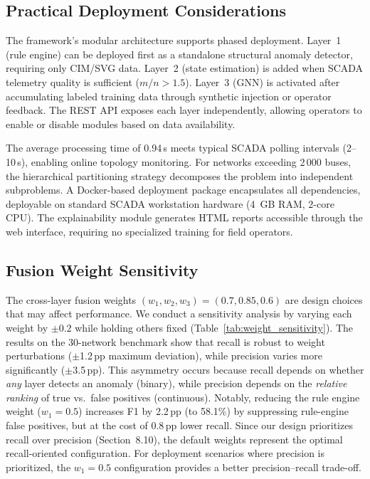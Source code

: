\documentclass[research]{fcs}
\begin{document}
\subsection{Practical Deployment Considerations}

The framework's modular architecture supports phased deployment. Layer~1 (rule engine) can be deployed first as a standalone structural anomaly detector, requiring only CIM/SVG data. Layer~2 (state estimation) is added when SCADA telemetry quality is sufficient ($m/n > 1.5$). Layer~3 (GNN) is activated after accumulating labeled training data through synthetic injection or operator feedback. The REST API exposes each layer independently, allowing operators to enable or disable modules based on data availability.

The average processing time of 0.94\,s meets typical SCADA polling intervals (2--10\,s), enabling online topology monitoring. For networks exceeding 2\,000 buses, the hierarchical partitioning strategy decomposes the problem into independent subproblems. A Docker-based deployment package encapsulates all dependencies, deployable on standard SCADA workstation hardware (4~GB RAM, 2-core CPU). The explainability module generates HTML reports accessible through the web interface, requiring no specialized training for field operators.

\subsection{Fusion Weight Sensitivity}

The cross-layer fusion weights $(w_1, w_2, w_3) = (0.7, 0.85, 0.6)$ are design choices that may affect performance. We conduct a sensitivity analysis by varying each weight by $\pm 0.2$ while holding others fixed (Table~\ref{tab:weight_sensitivity}). The results on the 30-network benchmark show that recall is robust to weight perturbations ($\pm$1.2\,pp maximum deviation), while precision varies more significantly ($\pm$3.5\,pp). This asymmetry occurs because recall depends on whether \emph{any} layer detects an anomaly (binary), while precision depends on the \emph{relative ranking} of true vs.\ false positives (continuous). Notably, reducing the rule engine weight ($w_1 = 0.5$) increases F1 by 2.2\,pp (to 58.1\%) by suppressing rule-engine false positives, but at the cost of 0.8\,pp lower recall. Since our design prioritizes recall over precision (Section~8.10), the default weights represent the optimal recall-oriented configuration. For deployment scenarios where precision is prioritized, the $w_1 = 0.5$ configuration provides a better precision--recall trade-off.
\end{document}
